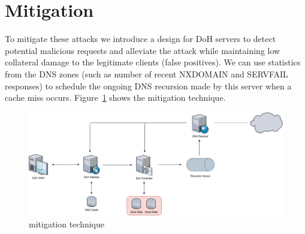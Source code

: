 \documentclass[11pt]{article}
\begin{document}
    \section{Mitigation}
    To mitigate these attacks we introduce a design for DoH servers to detect potential malicious requests and alleviate the attack while maintaining low collateral damage to the legitimate clients (false positives).
    We can use statistics from the DNS zones (such as number of recent NXDOMAIN and SERVFAIL responses) to schedule the ongoing DNS recursion made by this server when a cache miss occurs.
    Figure~\ref{fig:mitigate} shows the mitigation technique.
    \begin{figure}[h]
        \includegraphics[width=\textwidth]{mitigation.png}
        \caption{mitigation technique}
        \label{fig:mitigate}
    \end{figure}
\end{document}

